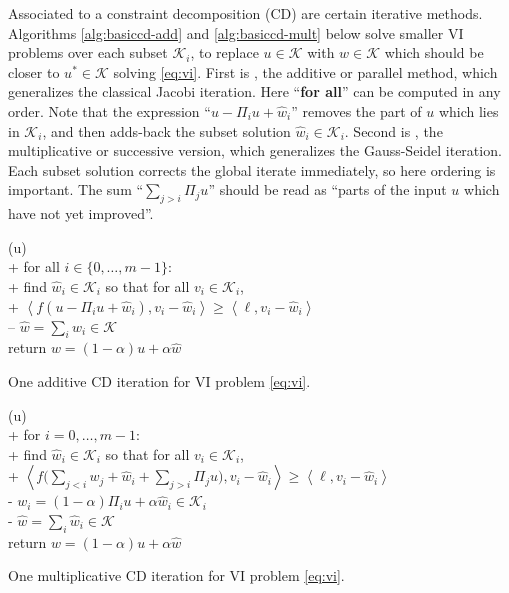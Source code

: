 \documentclass[letterpaper,final,12pt,reqno]{amsart}
\theoremstyle{cstyle}
\theoremstyle{cstyle*}
\theoremstyle{dstyle}
\numberwithin{equation}{section}
\numberwithin{figure}{section}
\numberwithin{table}{section}
\numberwithin{theorem}{section}
\newcommand{\cK}{\mathcal{K}}
\newcommand{\ip}[2]{\left<#1,#2\right>}
\begin{document}
Associated to a constraint decomposition (CD) are certain iterative methods.  Algorithms \ref{alg:basiccd-add} and \ref{alg:basiccd-mult} below solve smaller VI problems over each subset $\cK_i$, to replace $u \in \cK$ with $w\in\cK$ which should be closer to $u^* \in \cK$ solving \eqref{eq:vi}.  First is , the additive or parallel method, which generalizes the classical Jacobi iteration.  Here ``\textbf{for all}'' can be computed in any order.  Note that the expression ``$u-\Pi_iu+\hat w_i$'' removes the part of $u$ which lies in $\mathcal{K}_i$, and then adds-back the subset solution $\hat w_i \in \mathcal{K}_i$.  Second is , the multiplicative or successive version, which generalizes the Gauss-Seidel iteration.  Each subset solution corrects the global iterate immediately, so here ordering is important.  The sum ``$\sum_{j>i} \Pi_j u$'' should be read as ``parts of the input $u$ which have not yet improved''.


\begin{pseudofloat}[H]
\begin{pseudo*}
(u)\text{:} \\+
    for all $i \in \{0,\dots,m-1\}$: \\+
        \rm{find} $\hat w_i\in \cK_i$ \rm{so that for all} $v_i\in \cK_i$, \\+
            $\boxed{\ip{f(u - \Pi_i u + \hat w_i)}{v_i-\hat w_i} \ge \ip{\ell}{v_i-\hat w_i}}$ \\--
    $\hat w = \sum_i \hat w_i\in\cK$ \\
    return $w=(1-\alpha) u + \alpha \hat w$
\end{pseudo*}
\caption{One additive CD iteration for VI problem \eqref{eq:vi}.}
\label{alg:basiccd-add}
\end{pseudofloat}

\begin{pseudofloat}
\begin{pseudo*}
(u)\text{:} \\+
    for $i = 0,\dots,m-1$: \\+
        \rm{find} $\hat w_i\in \cK_i$ \rm{so that for all} $v_i\in \cK_i$, \\+
            $\displaystyle \boxed{\ip{f\Big(\sum_{j<i} w_j + \hat w_i + \sum_{j>i} \Pi_j u\Big)}{v_i-\hat w_i} \ge \ip{\ell}{v_i-\hat w_i}}$ \\-
            $w_i = (1-\alpha) \Pi_i u + \alpha \hat w_i\in\cK_i$ \\-
    $\hat w = \sum_i \hat w_i\in\cK$ \\
    return $w=(1-\alpha) u + \alpha \hat w$
\end{pseudo*}
\caption{One multiplicative CD iteration for VI problem \eqref{eq:vi}.}
\label{alg:basiccd-mult}
\end{pseudofloat}
\end{document}
